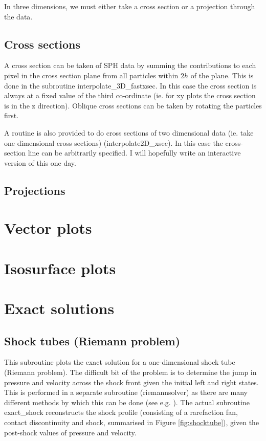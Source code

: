 \documentclass[a4paper,12pt]{article}
\begin{document}
In three dimensions, we must either take a cross section or a projection
through the data.

\subsection{Cross sections}
 A cross section can be taken of SPH data by summing the
contributions to each pixel in the cross section plane from all particles within
$2h$ of the plane. This is done in the subroutine interpolate\_3D\_fastxsec. In
this case the cross section is always at a fixed value of the third co-ordinate
(ie. for xy plots the cross section is in the z direction). Oblique cross
sections can be taken by rotating the particles first.

 A routine is also provided to do cross sections of two dimensional data (ie. take one dimensional
cross sections) (interpolate2D\_xsec). In this case the cross-section line can be arbitrarily
specified. I will hopefully write an interactive version of this one day.


\subsection{Projections}


\section{Vector plots}

\section{Isosurface plots}

\section{Exact solutions}

\subsection{Shock tubes (Riemann problem)}
 This subroutine plots the exact solution for a one-dimensional shock tube
(Riemann problem). The difficult bit of the problem is to determine the jump in
pressure and velocity across the shock front given the initial left and right
states. This is performed in a separate subroutine (riemannsolver) as there are 
many different methods by which this can be done (see e.g. \citealt{toro92}). 
The actual subroutine exact\_shock reconstructs the shock profile (consisting of
a rarefaction fan, contact discontinuity and shock, summarised in Figure
\ref{fig:shocktube}), given the post-shock values of pressure and
velocity. 
\end{document}
